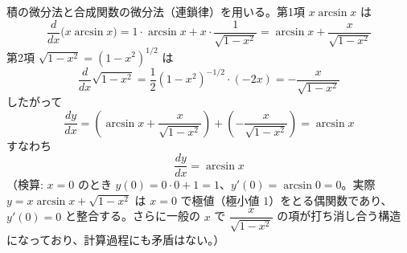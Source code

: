 
積の微分法と合成関数の微分法（連鎖律）を用いる。第1項 $x\arcsin x$ は
\[
\frac{d}{dx}\bigl(x\arcsin x\bigr) = 1\cdot \arcsin x + x\cdot \frac{1}{\sqrt{1-x^{2}}}
= \arcsin x + \frac{x}{\sqrt{1-x^{2}}}
\]
第2項 $\sqrt{1-x^{2}} = (1-x^{2})^{1/2}$ は
\[
\frac{d}{dx}\sqrt{1-x^{2}} = \frac{1}{2}(1-x^{2})^{-1/2}\cdot(-2x) = -\frac{x}{\sqrt{1-x^{2}}}
\]
したがって
\[
\frac{dy}{dx} = \left(\arcsin x + \frac{x}{\sqrt{1-x^{2}}}\right) + \left(-\frac{x}{\sqrt{1-x^{2}}}\right) = \arcsin x
\]
すなわち
\[
\boxed{\; \frac{dy}{dx} = \arcsin x \;}
\]
（検算: $x=0$ のとき $y(0) = 0\cdot 0 + 1 = 1$、$y'(0) = \arcsin 0 = 0$。実際 $y=x\arcsin x+\sqrt{1-x^{2}}$ は $x=0$ で極値（極小値 $1$）をとる偶関数であり、$y'(0)=0$ と整合する。さらに一般の $x$ で $\dfrac{x}{\sqrt{1-x^2}}$ の項が打ち消し合う構造になっており、計算過程にも矛盾はない。）
